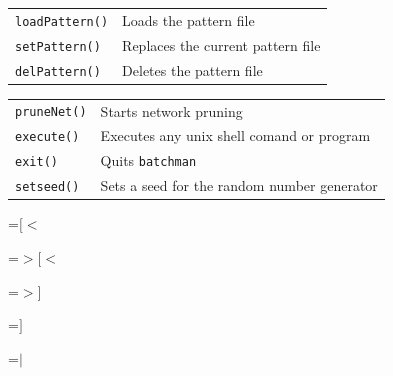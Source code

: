 {\newpage
\clearpage
\samepage \begin{tabular}{|l|l|} \hline 
{\tt loadPattern()} &  Loads the pattern file\\ 
{\tt setPattern()} & Replaces the current pattern file\\ 
{\tt delPattern()} &  Deletes the pattern file\\  \hline
\end{tabular}
}

{\newpage
\clearpage
\samepage {}
}

{\newpage
\clearpage
\samepage \begin{tabular}{|l|l|} \hline 
{\tt pruneNet()} & Starts network pruning\\ 
{\tt execute()} & Executes any unix shell comand or program\\ 
{\tt exit()} &  Quits {\tt batchman}\\  
{\tt setseed()} & Sets a seed for the random number generator\\  \hline
\end{tabular}
}

{\newpage
\clearpage
\samepage \setbox\sizebox=\hbox{$[<$}\box\sizebox
}

{\newpage
\clearpage
\samepage \setbox\sizebox=\hbox{$>[<$}\box\sizebox
}

{\newpage
\clearpage
\samepage \setbox\sizebox=\hbox{$>]$}\box\sizebox
}

{\newpage
\clearpage
\samepage \setbox\sizebox=\hbox{$]$}\box\sizebox
}

{\newpage
\clearpage
\samepage \setbox\sizebox=\hbox{$\mid$}\box\sizebox
}

